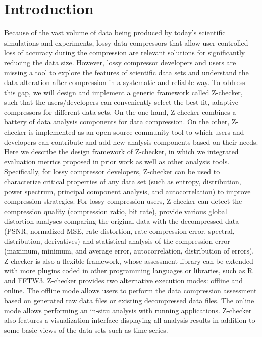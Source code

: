\section{Introduction}

Because of the vast volume of data being produced by today's scientific simulations and experiments, lossy data compressors that allow user-controlled loss of accuracy during the compression are relevant solutions for significantly reducing the data size. However, lossy compressor developers and users are missing a tool to explore the features of scientific data sets and understand the data alteration after compression in a systematic and reliable way. To address this gap, we will design and implement a generic framework called Z-checker, such that the users/developers can conveniently select the best-fit, adaptive compressors for different data sets. On the one hand, Z-checker combines a battery of data analysis components for data compression. On the other, Z-checker is implemented as an open-source community tool to which users and developers can contribute and add new analysis components based on their needs. Here we describe the design framework of Z-checker, in which we integrated evaluation metrics proposed in prior work as well as other analysis tools. Specifically, for lossy compressor developers, Z-checker can be used to characterize critical properties of any data set (such as entropy, distribution, power spectrum, principal component analysis, and autocorrelation) to improve compression strategies. For lossy compression users, Z-checker can detect the compression quality (compression ratio, bit rate), provide various global distortion analyses comparing the original data with the decompressed data (PSNR, normalized MSE, rate-distortion, rate-compression error, spectral, distribution, derivatives) and statistical analysis of the compression error (maximum, minimum, and average error, autocorrelation, distribution of errors). Z-checker is also a flexible framework, whose assessment library can be extended with more plugins coded in other programming languages or libraries, such as R and FFTW3. Z-checker provides two alternative execution modes: offline and online. The offline mode allows users to perform the data compression assessment based on generated raw data files or existing decompressed data files. The online mode allows performing an in-situ analysis with running applications. Z-checker also features a visualization interface displaying all analysis results in addition to some basic views of the data sets such as time series.
